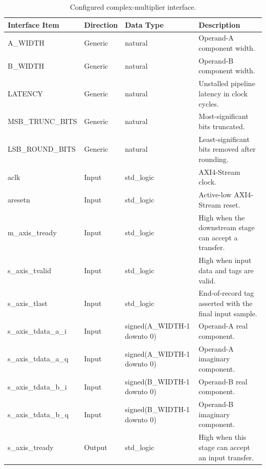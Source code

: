\begin{table}[H]
\singlespacing
\small
\setlength{\tabcolsep}{2pt}
\renewcommand{\arraystretch}{0.95}
\begin{center}
\caption{Configured complex-multiplier interface.}
\begin{tabularx}{\textwidth}{|L{0.24\textwidth}|L{0.13\textwidth}|L{0.28\textwidth}|Y|}
\hline
\textbf{Interface Item} & \textbf{Direction} & \textbf{Data Type} & \textbf{Description} \\
\hline

A\_WIDTH        & Generic & natural & Operand-A component width. \\
\hline
B\_WIDTH        & Generic & natural & Operand-B component width. \\
\hline
LATENCY         & Generic & natural & Unstalled pipeline latency in clock cycles. \\
\hline
MSB\_TRUNC\_BITS & Generic & natural & Most-significant bits truncated. \\
\hline
LSB\_ROUND\_BITS & Generic & natural & Least-significant bits removed after rounding. \\
\hline
aclk            & Input & std\_logic & AXI4-Stream clock. \\
\hline
aresetn         & Input & std\_logic & Active-low AXI4-Stream reset. \\
\hline
m\_axis\_tready & Input & std\_logic & High when the downstream stage can accept a transfer. \\
\hline
s\_axis\_tvalid & Input & std\_logic & High when input data and tags are valid. \\
\hline
s\_axis\_tlast & Input & std\_logic & End-of-record tag asserted with the final input sample. \\
\hline
s\_axis\_tdata\_a\_i & Input & signed(A\_WIDTH-1 \newline downto 0) & Operand-A real component.  \\
\hline
s\_axis\_tdata\_a\_q & Input & signed(A\_WIDTH-1 \newline downto 0) & Operand-A imaginary component.  \\
\hline
s\_axis\_tdata\_b\_i & Input & signed(B\_WIDTH-1 \newline downto 0) & Operand-B real component.  \\
\hline
s\_axis\_tdata\_b\_q & Input & signed(B\_WIDTH-1 \newline downto 0) & Operand-B imaginary component.  \\
\hline
s\_axis\_tready & Output & std\_logic & High when this stage can accept an input transfer. \\

\end{tabularx}
\end{center}
\end{table}

